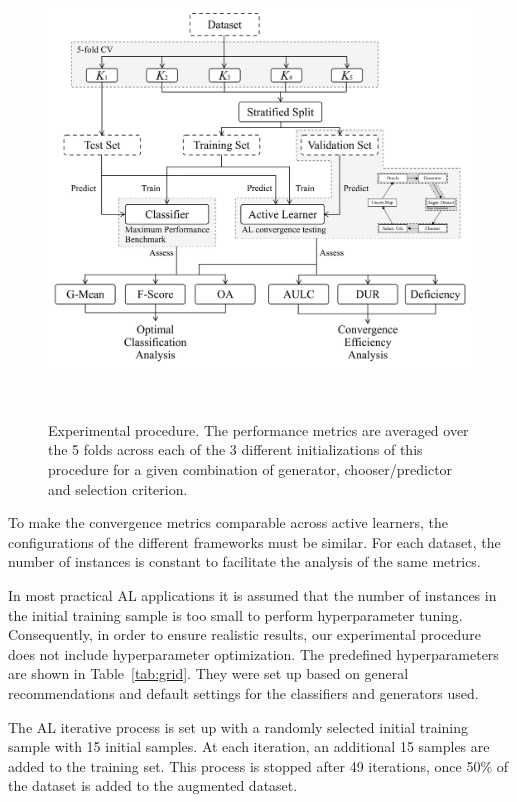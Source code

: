 \documentclass[preprint,12pt]{elsarticle}
\begin{document}
\begin{figure}[H]
	\centering
	\includegraphics[width=\linewidth]{../analysis/experiment_pipeline}
    \caption{Experimental procedure. The performance metrics are averaged over
    the 5 folds across each of the 3 different initializations of this
    procedure for a given combination of generator, chooser/predictor and
    selection criterion.}~\label{fig:experiment_pipeline}
\end{figure}

To make the convergence metrics comparable across active learners, the
configurations of the different frameworks must be similar. For each dataset,
the number of instances is constant to facilitate the analysis of the same
metrics. 

In most practical AL applications it is assumed that the number of instances 
in the initial training sample is too small to perform hyperparameter tuning.
Consequently, in order to ensure realistic results, our experimental procedure
does not include hyperparameter optimization. The predefined hyperparameters
are shown in Table~\ref{tab:grid}. They were set up based on general
recommendations and default settings for the classifiers and generators used.

The AL iterative process is set up with a randomly selected initial training
sample with 15 initial samples. At each iteration, an additional 15 samples are
added to the training set. This process is stopped after 49 iterations, once
50\% of the dataset is added to the augmented dataset.
\end{document}
